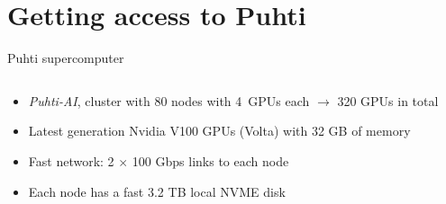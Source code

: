\documentclass[aspectratio=1610,14pt]{beamer}
\newcommand{\vitem}{\vfill\item}
\begin{document}
\section{Getting access to Puhti}

\begin{frame}{Puhti supercomputer}
  \begin{columns}
    \begin{column}{0.76\linewidth}
      \begin{minipage}[c][0.6\textheight][s]{\columnwidth}
      \begin{itemize}
        \item \emph{Puhti-AI}, cluster with 80 nodes with \mbox{4 GPUs}
        each $\rightarrow$ 320 GPUs in total
        \vitem Latest generation Nvidia V100 GPUs (Volta) with 32 GB of memory
        \vitem Fast network: 2 $\times$ 100 Gbps links to each node
        \vitem Each node has a fast 3.2 TB local NVME disk
      \end{itemize}
      \vfill
      \end{minipage}
    \end{column}
    \begin{column}{0.24\linewidth}

\end{column}
\end{columns}
\end{frame}
\end{document}
